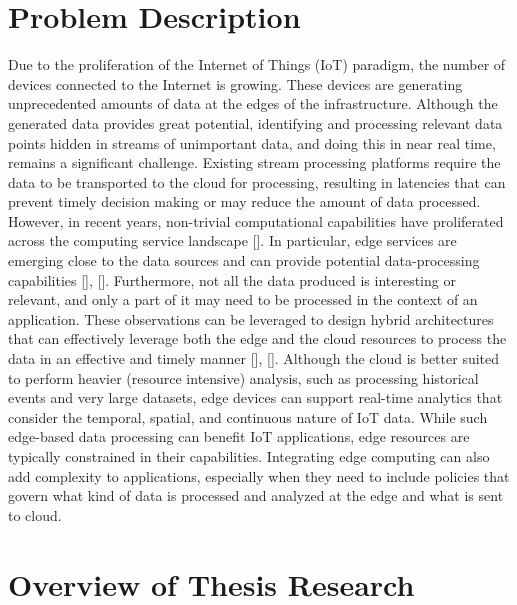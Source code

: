 \section{Problem Description}
Due to the proliferation of the Internet of Things (IoT) paradigm, the number of devices connected to the Internet is growing. These devices are generating unprecedented amounts of data at the edges of the infrastructure. Although the generated data provides great potential, identifying and processing relevant data points hidden in streams of unimportant data, and doing this in near real time, remains a significant challenge. Existing stream processing platforms require the data to be transported to the
cloud for processing, resulting in latencies that can prevent timely decision making or may reduce the amount of data processed. However, in recent years, non-trivial computational capabilities have proliferated across the computing service landscape []. In particular, edge services are emerging close to the data sources and can provide potential data-processing capabilities [], []. Furthermore, not all the data produced is interesting or relevant, and only a part of it may need to be processed in the context of an application. These observations can be leveraged to design hybrid architectures that can
effectively leverage both the edge and the cloud resources to process the data in an effective and timely manner [], []. Although the cloud is better suited to perform heavier (resource intensive) analysis, such as processing historical events and very large datasets, edge devices can support real-time analytics that consider the temporal, spatial, and continuous nature of IoT data. While such edge-based data processing can benefit IoT applications, edge resources are typically constrained in their capabilities. Integrating edge computing can also add complexity to applications, especially when they need to include policies that govern what kind of data is processed and analyzed at the edge and what is sent to cloud.

\section{Overview of Thesis Research}

